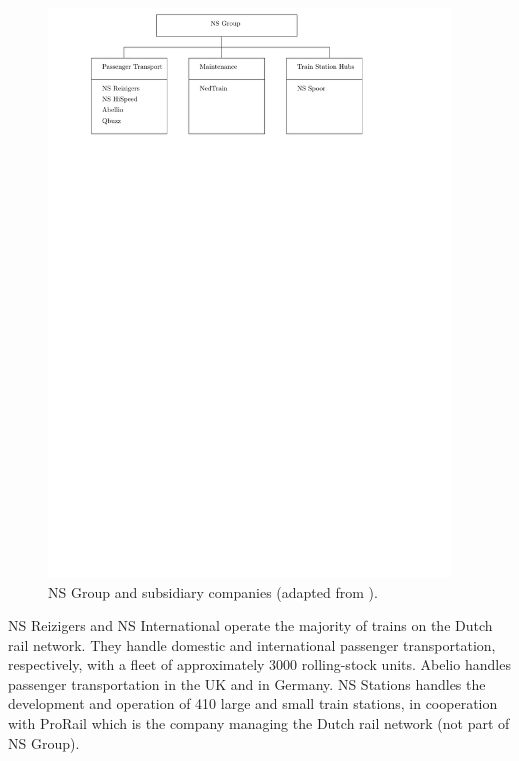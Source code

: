 		\begin{figure}
			\centering
			\includegraphics[width=0.95\textwidth]{chapter/introduction/ns-structure}
			\caption{NS Group and subsidiary companies (adapted from \cite{NS2016}).} 
			\label{fig-ns}
		\end{figure}

		NS Reizigers and NS International operate the majority of trains on the Dutch rail network.
		They handle domestic and international passenger transportation, respectively,
		with a fleet of approximately 3000 rolling-stock units.
		Abelio handles passenger transportation in the UK and in Germany.
		NS Stations handles the development and operation of 410 large and small train stations,
		in cooperation with ProRail which is the company managing the Dutch rail network (not part of NS Group).

